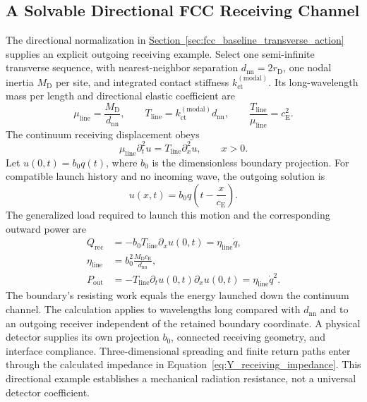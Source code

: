 \subsection{A Solvable Directional FCC Receiving Channel}
\label{sec:Y_directional_receiver}

The directional normalization in \hyperref[sec:fcc_baseline_transverse_action]{Section~\ref*{sec:fcc_baseline_transverse_action}} supplies an explicit outgoing receiving example. Select one semi-infinite transverse sequence, with nearest-neighbor separation $d_{\mathrm{nn}}=2r_{\mathrm D}$, one nodal inertia $M_{\mathrm D}$ per site, and integrated contact stiffness $k_{\mathrm{ct}}^{(\mathrm{modal})}$. Its long-wavelength mass per length and directional elastic coefficient are
\begin{equation}
    \mu_{\mathrm{line}}=\frac{M_{\mathrm D}}{d_{\mathrm{nn}}},
    \qquad
    T_{\mathrm{line}}=k_{\mathrm{ct}}^{(\mathrm{modal})}d_{\mathrm{nn}},
    \qquad
    \frac{T_{\mathrm{line}}}{\mu_{\mathrm{line}}}=c_{\mathrm E}^2.
\end{equation}
The continuum receiving displacement obeys
\begin{equation}
    \mu_{\mathrm{line}}\partial_t^2u
    =T_{\mathrm{line}}\partial_x^2u,
    \qquad x>0.
\end{equation}
Let $u(0,t)=b_0q(t)$, where $b_0$ is the dimensionless boundary projection. For compatible launch history and no incoming wave, the outgoing solution is
\begin{equation}
    u(x,t)=b_0q\!\left(t-\frac{x}{c_{\mathrm E}}\right).
\end{equation}
The generalized load required to launch this motion and the corresponding outward power are
\begin{align}
    Q_{\mathrm{rec}}
    &=-b_0T_{\mathrm{line}}\partial_xu(0,t)
    =\eta_{\mathrm{line}}\dot q,
    \nonumber\\
    \eta_{\mathrm{line}}
    &=\boxed{b_0^2\frac{M_{\mathrm D}c_{\mathrm E}}{d_{\mathrm{nn}}}},
    \label{eq:Y_directional_radiation_resistance}\\
    P_{\mathrm{out}}
    &=-T_{\mathrm{line}}\partial_tu(0,t)\partial_xu(0,t)
    =\eta_{\mathrm{line}}\dot q^2.
    \label{eq:Y_directional_power}
\end{align}
The boundary's resisting work equals the energy launched down the continuum channel. The calculation applies to wavelengths long compared with $d_{\mathrm{nn}}$ and to an outgoing receiver independent of the retained boundary coordinate. A physical detector supplies its own projection $b_0$, connected receiving geometry, and interface compliance. Three-dimensional spreading and finite return paths enter through the calculated impedance in Equation~\eqref{eq:Y_receiving_impedance}. This directional example establishes a mechanical radiation resistance, not a universal detector coefficient.

